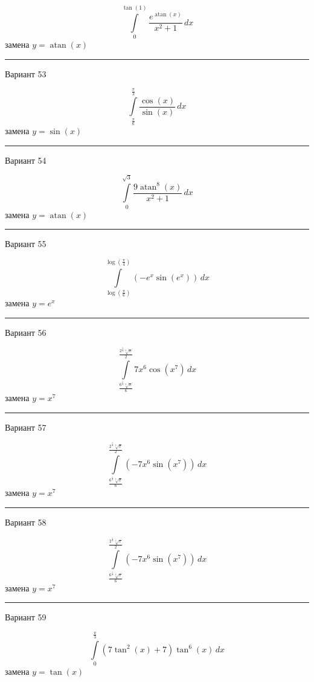 \documentclass[11pt]{report}
\begin{document}
$$\int\limits_{0}^{\tan{\left(1 \right)}} \frac{e^{\operatorname{atan}{\left(x \right)}}}{x^{2} + 1}\, dx$$
замена $y = \operatorname{atan}{\left(x \right)}$



\rule{\textwidth}{.2mm}

Вариант 53

$$\int\limits_{\frac{\pi}{6}}^{\frac{\pi}{3}} \frac{\cos{\left(x \right)}}{\sin{\left(x \right)}}\, dx$$
замена $y = \sin{\left(x \right)}$



\rule{\textwidth}{.2mm}

Вариант 54

$$\int\limits_{0}^{\sqrt{3}} \frac{9 \operatorname{atan}^{8}{\left(x \right)}}{x^{2} + 1}\, dx$$
замена $y = \operatorname{atan}{\left(x \right)}$



\rule{\textwidth}{.2mm}

Вариант 55

$$\int\limits_{\log{\left(\frac{\pi}{6} \right)}}^{\log{\left(\frac{\pi}{4} \right)}} \left(- e^{x} \sin{\left(e^{x} \right)}\right)\, dx$$
замена $y = e^{x}$



\rule{\textwidth}{.2mm}

Вариант 56

$$\int\limits_{\frac{6^{\frac{6}{7}} \sqrt[7]{\pi}}{6}}^{\frac{2^{\frac{5}{7}} \sqrt[7]{\pi}}{2}} 7 x^{6} \cos{\left(x^{7} \right)}\, dx$$
замена $y = x^{7}$



\rule{\textwidth}{.2mm}

Вариант 57

$$\int\limits_{\frac{6^{\frac{6}{7}} \sqrt[7]{\pi}}{6}}^{\frac{2^{\frac{5}{7}} \sqrt[7]{\pi}}{2}} \left(- 7 x^{6} \sin{\left(x^{7} \right)}\right)\, dx$$
замена $y = x^{7}$



\rule{\textwidth}{.2mm}

Вариант 58

$$\int\limits_{\frac{6^{\frac{6}{7}} \sqrt[7]{\pi}}{6}}^{\frac{2^{\frac{5}{7}} \sqrt[7]{\pi}}{2}} \left(- 7 x^{6} \sin{\left(x^{7} \right)}\right)\, dx$$
замена $y = x^{7}$



\rule{\textwidth}{.2mm}

Вариант 59

$$\int\limits_{0}^{\frac{\pi}{3}} \left(7 \tan^{2}{\left(x \right)} + 7\right) \tan^{6}{\left(x \right)}\, dx$$
замена $y = \tan{\left(x \right)}$
\end{document}
